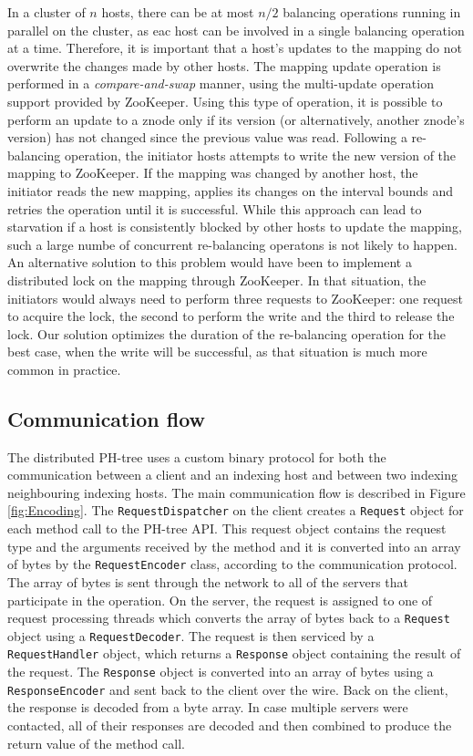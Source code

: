 \documentclass[11pt,a4paper]{globis-book}
\begin{document}
In a cluster of $n$ hosts, there can be at most $n/2$ balancing operations running in parallel on the cluster, as eac host can be involved in a single balancing operation at a time. Therefore, it is important that a host's updates to the mapping do not overwrite the changes made by other hosts. The mapping update operation is performed in a \textit{compare-and-swap} manner, using the multi-update operation support provided by ZooKeeper. Using this type of operation, it is possible to perform an update to a znode only if its version (or alternatively, another znode's version) has not changed since the previous value was read. Following a re-balancing operation, the initiator hosts attempts to write the new version of the mapping to ZooKeeper. If the mapping was changed by another host, the initiator reads the new mapping, applies its changes on the interval bounds and retries the operation until it is successful. While this approach can lead to starvation if a host is consistently blocked by other hosts to update the mapping, such a large numbe of concurrent re-balancing operatons is not likely to happen. An alternative solution to this problem would have been to implement a distributed lock on the mapping through ZooKeeper. In that situation, the initiators would always need to perform three requests to ZooKeeper: one request to acquire the lock, the second to perform the write and the third to release the lock. Our solution optimizes the duration of the re-balancing operation for the best case, when the write will be successful, as that situation is much more common in practice. 

\subsection{Communication flow}

The distributed PH-tree uses a custom binary protocol for both the communication between a client and an indexing host and between two indexing neighbouring indexing hosts. The main communication flow is described in Figure \ref{fig:Encoding}. The \texttt{RequestDispatcher} on the client creates a \texttt{Request} object for each method call to the PH-tree API. This request object contains the request type and the arguments received by the method and it is converted into an array of bytes by the \texttt{RequestEncoder} class, according to the communication protocol. The array of bytes is sent through the network to all of the servers that participate in the operation. On the server, the request is assigned to one of request processing threads which converts the array of bytes back to a \texttt{Request} object using a \texttt{RequestDecoder}. The request is then serviced by a \texttt{RequestHandler} object, which returns a \texttt{Response} object containing the result of the request. The \texttt{Response} object is converted into an array of bytes using a \texttt{ResponseEncoder} and sent back to the client over the wire. Back on the client, the response is decoded from a byte array. In case multiple servers were contacted, all of their responses are decoded and then combined to produce the return value of the method call.
\end{document}
